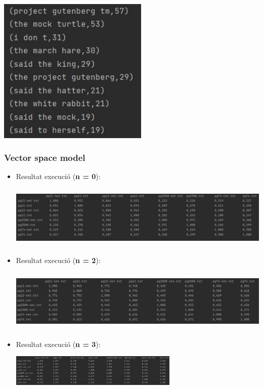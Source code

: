 \documentclass[11pt,a4paper]{article}
\begin{document}
			\begin{center}
				\includegraphics[height=7cm]{captures/primeraPart/ngrames/execucio.jpg}
			\end{center}
		
		\subsubsection{Vector space model}
		
			\begin{itemize}
			
				\item Resultat execució (\textbf{n = 0}):
			
				\begin{center}
					\includegraphics[height=3cm]{captures/primeraPart/vectorspacemodel/execucio0.jpg}
				\end{center}
				
				\item Resultat execució (\textbf{n = 2}):
				
				\begin{center}
					\includegraphics[height=3cm]{captures/primeraPart/vectorspacemodel/execucio2.jpg}
				\end{center}
				
				\item Resultat execució (\textbf{n = 3}):
				
				\begin{center}
					\includegraphics[height=1.5cm]{captures/primeraPart/vectorspacemodel/execucio3.jpg}
				\end{center}	
			
			\end{itemize}
			
\end{document}
